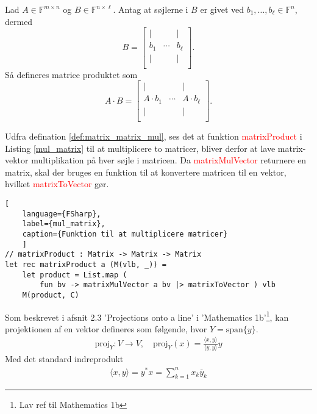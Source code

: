 \begin{definition}\label{def:matrix_matrix_mul}
    Lad $A \in \mathbb{F}^{m \times n}$ og $B \in \mathbb{F}^{n \times \ell}$. Antag at søjlerne i $B$ er givet ved $b_1, \ldots, b_\ell \in \mathbb{F}^n$, dermed
    \[
        B = \begin{bmatrix}
    | &  & | \\
    b_1 & \cdots & b_\ell \\
    | &  & | \\
\end{bmatrix}.
\]
Så defineres matrice produktet som
\[
    A \cdot B = \begin{bmatrix}
        | &  & | \\
        A \cdot b_1 & \cdots & A \cdot b_\ell \\
        | &  & | \\
    \end{bmatrix}.
    \]
\end{definition}
Udfra defination \ref{def:matrix_matrix_mul}, ses det at funktion \textcolor{red}{matrixProduct} i Listing \ref{mul_matrix} til at multiplicere to matricer, bliver derfor at lave matrix-vektor multiplikation på hver søjle i matricen. Da \textcolor{red}{matrixMulVector} returnere en matrix, skal der bruges en funktion til at konvertere matricen til en vektor, hvilket \textcolor{red}{matrixToVector} gør.
\begin{lstlisting}[
    language={FSharp}, 
    label={mul_matrix}, 
    caption={Funktion til at multiplicere matricer}
    ]
// matrixProduct : Matrix -> Matrix -> Matrix
let rec matrixProduct a (M(vlb, _)) =
    let product = List.map (
        fun bv -> matrixMulVector a bv |> matrixToVector ) vlb
    M(product, C)
\end{lstlisting}
    
Som beskrevet i afsnit 2.3 'Projections onto a line' i 'Mathematics 1b'\footnote{Lav ref til Mathematics 1b}, kan projektionen af en vektor defineres som følgende, hvor $Y = \text{span}\{y\}$.
\begin{align}
    \text{proj}_Y : V \rightarrow V, \quad \text{proj}_Y(x) = \frac{\langle x, y \rangle}{\langle y, y \rangle} y
    \label{proj}
\end{align}
Med det standard indreprodukt 
\begin{align}
    \langle x, y \rangle = y^* x =\sum_{k=1}^{n} x_k \overline{y}_k
\end{align}

